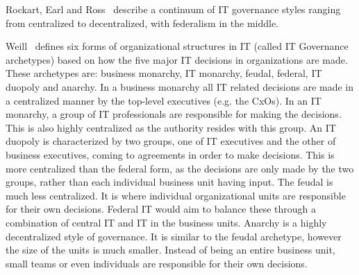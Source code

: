 Rockart, Earl and Ross~\cite{Rockart1996} describe a continuum of IT governance styles ranging from centralized to decentralized, with federalism in the middle. 

Weill~\cite{Weill2004} defines six forms of organizational structures in IT (called IT Governance archetypes) based on how the five major IT decisions in organizations are made. These archetypes are: business monarchy, IT monarchy, feudal, federal, IT duopoly and anarchy.   In a business monarchy all IT related decisions are made in a centralized manner by the top-level executives (e.g. the CxOs). In an IT monarchy, a group of IT professionals are responsible for making the decisions. This is also highly centralized as the authority resides with this group. An IT duopoly is characterized by two groups, one of IT executives and the other of business executives, coming to agreements in order to make decisions. This is more centralized than the federal form, as the decisions are only made by the two groups, rather than each individual business unit having input. The feudal is much less centralized. It is where individual organizational units are responsible for their own decisions. Federal IT would aim to balance these through a combination of central IT and IT in the business units. Anarchy is a highly decentralized style of governance. It is similar to the feudal archetype, however the size of the units is much smaller. Instead of being an entire business unit, small teams or even individuals are responsible for their own decisions.






